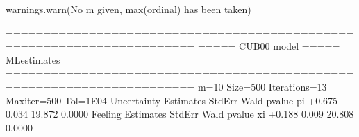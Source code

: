 \documentclass[letterpaper,10pt,english]{sphinxmanual}
\begin{document}
\begin{sphinxVerbatim}[commandchars=\\\{\}]
warnings.warn(\PYGZdq{}No m given, max(ordinal) has been taken\PYGZdq{})

=======================================================================
=====\PYGZgt{}\PYGZgt{}\PYGZgt{} CUB00 model \PYGZlt{}\PYGZlt{}\PYGZlt{}===== ML\PYGZhy{}estimates
=======================================================================
m=10  Size=500  Iterations=13  Maxiter=500  Tol=1E\PYGZhy{}04
\PYGZhy{}\PYGZhy{}\PYGZhy{}\PYGZhy{}\PYGZhy{}\PYGZhy{}\PYGZhy{}\PYGZhy{}\PYGZhy{}\PYGZhy{}\PYGZhy{}\PYGZhy{}\PYGZhy{}\PYGZhy{}\PYGZhy{}\PYGZhy{}\PYGZhy{}\PYGZhy{}\PYGZhy{}\PYGZhy{}\PYGZhy{}\PYGZhy{}\PYGZhy{}\PYGZhy{}\PYGZhy{}\PYGZhy{}\PYGZhy{}\PYGZhy{}\PYGZhy{}\PYGZhy{}\PYGZhy{}\PYGZhy{}\PYGZhy{}\PYGZhy{}\PYGZhy{}\PYGZhy{}\PYGZhy{}\PYGZhy{}\PYGZhy{}\PYGZhy{}\PYGZhy{}\PYGZhy{}\PYGZhy{}\PYGZhy{}\PYGZhy{}\PYGZhy{}\PYGZhy{}\PYGZhy{}\PYGZhy{}\PYGZhy{}\PYGZhy{}\PYGZhy{}\PYGZhy{}\PYGZhy{}\PYGZhy{}\PYGZhy{}\PYGZhy{}\PYGZhy{}\PYGZhy{}\PYGZhy{}\PYGZhy{}\PYGZhy{}\PYGZhy{}\PYGZhy{}\PYGZhy{}\PYGZhy{}\PYGZhy{}\PYGZhy{}\PYGZhy{}\PYGZhy{}\PYGZhy{}
Uncertainty
    Estimates  StdErr    Wald  p\PYGZhy{}value
pi     +0.675   0.034  19.872   0.0000
\PYGZhy{}\PYGZhy{}\PYGZhy{}\PYGZhy{}\PYGZhy{}\PYGZhy{}\PYGZhy{}\PYGZhy{}\PYGZhy{}\PYGZhy{}\PYGZhy{}\PYGZhy{}\PYGZhy{}\PYGZhy{}\PYGZhy{}\PYGZhy{}\PYGZhy{}\PYGZhy{}\PYGZhy{}\PYGZhy{}\PYGZhy{}\PYGZhy{}\PYGZhy{}\PYGZhy{}\PYGZhy{}\PYGZhy{}\PYGZhy{}\PYGZhy{}\PYGZhy{}\PYGZhy{}\PYGZhy{}\PYGZhy{}\PYGZhy{}\PYGZhy{}\PYGZhy{}\PYGZhy{}\PYGZhy{}\PYGZhy{}\PYGZhy{}\PYGZhy{}\PYGZhy{}\PYGZhy{}\PYGZhy{}\PYGZhy{}\PYGZhy{}\PYGZhy{}\PYGZhy{}\PYGZhy{}\PYGZhy{}\PYGZhy{}\PYGZhy{}\PYGZhy{}\PYGZhy{}\PYGZhy{}\PYGZhy{}\PYGZhy{}\PYGZhy{}\PYGZhy{}\PYGZhy{}\PYGZhy{}\PYGZhy{}\PYGZhy{}\PYGZhy{}\PYGZhy{}\PYGZhy{}\PYGZhy{}\PYGZhy{}\PYGZhy{}\PYGZhy{}\PYGZhy{}\PYGZhy{}
Feeling
    Estimates  StdErr    Wald  p\PYGZhy{}value
xi     +0.188   0.009  20.808   0.0000
\PYGZhy{}\PYGZhy{}\PYGZhy{}\PYGZhy{}\PYGZhy{}\PYGZhy{}\PYGZhy{}\PYGZhy{}\PYGZhy{}\PYGZhy{}\PYGZhy{}\PYGZhy{}\PYGZhy{}\PYGZhy{}\PYGZhy{}\PYGZhy{}\PYGZhy{}\PYGZhy{}\PYGZhy{}\PYGZhy{}\PYGZhy{}\PYGZhy{}\PYGZhy{}\PYGZhy{}\PYGZhy{}\PYGZhy{}\PYGZhy{}\PYGZhy{}\PYGZhy{}\PYGZhy{}\PYGZhy{}\PYGZhy{}\PYGZhy{}\PYGZhy{}\PYGZhy{}\PYGZhy{}\PYGZhy{}\PYGZhy{}\PYGZhy{}\PYGZhy{}\PYGZhy{}\PYGZhy{}\PYGZhy{}\PYGZhy{}\PYGZhy{}\PYGZhy{}\PYGZhy{}\PYGZhy{}\PYGZhy{}\PYGZhy{}\PYGZhy{}\PYGZhy{}\PYGZhy{}\PYGZhy{}\PYGZhy{}\PYGZhy{}\PYGZhy{}\PYGZhy{}\PYGZhy{}\PYGZhy{}\PYGZhy{}\PYGZhy{}\PYGZhy{}\PYGZhy{}\PYGZhy{}\PYGZhy{}\PYGZhy{}\PYGZhy{}\PYGZhy{}\PYGZhy{}\PYGZhy{}

\end{sphinxVerbatim}
\end{document}
